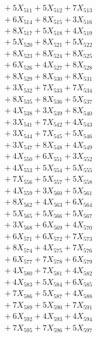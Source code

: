 \documentclass[a4paper,10pt]{article}
\begin{document}
{\begin{align}
&\;  + 5 X_{511} + 5 X_{512} + 7 X_{513} \\[0.3ex]
&\;  + 6 X_{514} + 8 X_{515} + 3 X_{516} \\[0.3ex]
&\;  + 8 X_{517} + 5 X_{518} + 4 X_{519} \\[0.5ex]\allowbreak
&\;  + 5 X_{520} + 8 X_{521} + 5 X_{522} \\[0.3ex]
&\;  + 8 X_{523} + 8 X_{524} + 8 X_{525} \\[0.3ex]
&\;  + 6 X_{526} + 4 X_{527} + 8 X_{528} \\[0.3ex]
&\;  + 8 X_{529} + 8 X_{530} + 8 X_{531} \\[0.3ex]
&\;  + 3 X_{532} + 7 X_{533} + 7 X_{534} \\[0.3ex]
&\;  + 8 X_{535} + 8 X_{536} + 5 X_{537} \\[0.3ex]
&\;  + 4 X_{538} + 3 X_{539} + 8 X_{540} \\[0.3ex]
&\;  + 3 X_{541} + 7 X_{542} + 4 X_{543} \\[0.3ex]
&\;  + 3 X_{544} + 7 X_{545} + 5 X_{546} \\[0.3ex]
&\;  + 3 X_{547} + 8 X_{548} + 4 X_{549} \\[0.5ex]\allowbreak
&\;  + 4 X_{550} + 6 X_{551} + 3 X_{552} \\[0.3ex]
&\;  + 4 X_{553} + 5 X_{554} + 5 X_{555} \\[0.3ex]
&\;  + 7 X_{556} + 5 X_{557} + 5 X_{558} \\[0.3ex]
&\;  + 4 X_{559} + 3 X_{560} + 5 X_{561} \\[0.3ex]
&\;  + 8 X_{562} + 4 X_{563} + 6 X_{564} \\[0.3ex]
&\;  + 5 X_{565} + 5 X_{566} + 5 X_{567} \\[0.3ex]
&\;  + 3 X_{568} + 6 X_{569} + 4 X_{570} \\[0.3ex]
&\;  + 6 X_{571} + 6 X_{572} + 7 X_{573} \\[0.3ex]
&\;  + 8 X_{574} + 4 X_{575} + 7 X_{576} \\[0.3ex]
&\;  + 6 X_{577} + 7 X_{578} + 6 X_{579} \\[0.5ex]\allowbreak
&\;  + 4 X_{580} + 7 X_{581} + 4 X_{582} \\[0.3ex]
&\;  + 4 X_{583} + 5 X_{584} + 6 X_{585} \\[0.3ex]
&\;  + 7 X_{586} + 5 X_{587} + 4 X_{588} \\[0.3ex]
&\;  + 7 X_{589} + 5 X_{590} + 7 X_{591} \\[0.3ex]
&\;  + 6 X_{592} + 4 X_{593} + 4 X_{594} \\[0.3ex]
&\;  + 7 X_{595} + 7 X_{596} + 5 X_{597} \\[0.3ex]

\end{align}}
\end{document}
